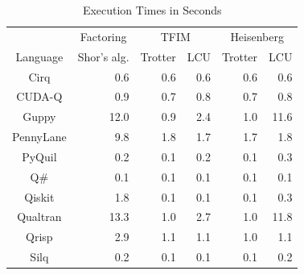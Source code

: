 \begin{table}[t]
  \centering
  \caption{Execution Times in Seconds}
  \begin{tabular}{c|r|rr|rr}
    \toprule
             & \multicolumn{1}{c|}{Factoring}
             & \multicolumn{2}{c|}{TFIM} & \multicolumn{2}{c}{Heisenberg} \\
    Language & Shor's alg. & Trotter & LCU & Trotter & LCU \\
    \midrule
    Cirq             &      0.6 &      0.6 &      0.6 &      0.6 &      0.6 \\
    CUDA-Q           &      0.9 &      0.7 &      0.8 &      0.7 &      0.8 \\
    Guppy            &     12.0 &      0.9 &      2.4 &      1.0 &     11.6 \\
    PennyLane        &      9.8 &      1.8 &      1.7 &      1.7 &      1.8 \\
    PyQuil           &      0.2 &      0.1 &      0.2 &      0.1 &      0.3 \\
    Q\#              &      0.1 &      0.1 &      0.1 &      0.1 &      0.1 \\
    Qiskit           &      1.8 &      0.1 &      0.1 &      0.1 &      0.3 \\
    Qualtran         &     13.3 &      1.0 &      2.7 &      1.0 &     11.8 \\
    \hline
    Qrisp            &      2.9 &      1.1 &      1.1 &      1.0 &      1.1 \\
    Silq             &      0.2 &      0.1 &      0.1 &      0.1 &      0.2 \\
    \bottomrule
  \end{tabular}
  \label{tab:experimental-results}
\end{table}
%
